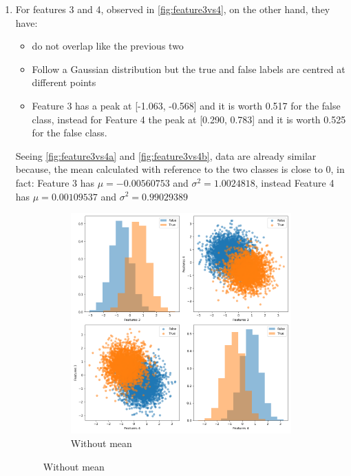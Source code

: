 \begin{enumerate}
    \item For features 3 and 4, observed in \autoref{fig:feature3vs4}, on the other hand, they have:
    \begin{itemize}
        \item do not overlap like the previous two
        \item Follow a Gaussian distribution but the true and false labels are centred at different
        points
        \item Feature 3 has a peak at [-1.063, -0.568] and it is worth 0.517 for the false class,
        instead for Feature 4 the peak at [0.290, 0.783] and it is worth 0.525 for the false class.
    \end{itemize}
    Seeing \autoref{fig:feature3vs4a} and \autoref{fig:feature3vs4b}, data are already similar because, the mean
    calculated with reference to the two classes is close to 0, in fact:
    Feature 3 has \(\mu = -0.00560753\) and \(\sigma^2 = 1.0024818\), instead
    Feature 4 has \(\mu = 0.00109537\) and \(\sigma^2 = 0.99029389\)
    \begin{figure}[h!]
        \centering
        \begin{subfigure}[b]{0.4\linewidth}
            \includegraphics[width=\linewidth]{Lab/02. Lab 02/Images/03. Graphics Features 3_4 Without Mean}
            \caption{Without mean}

\end{subfigure}
\end{figure}
\end{enumerate}
